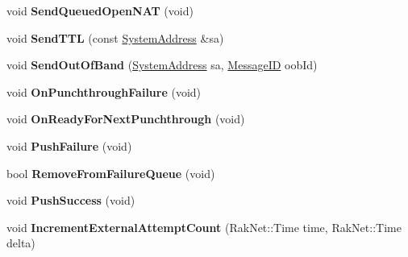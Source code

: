 \begin{DoxyCompactItemize}
\item 
\hypertarget{class_rak_net_1_1_nat_punchthrough_client_a8210cfd7a27ab5551362c7c826b4a342}{void {\bfseries Send\-Queued\-Open\-N\-A\-T} (void)}\label{class_rak_net_1_1_nat_punchthrough_client_a8210cfd7a27ab5551362c7c826b4a342}

\item 
\hypertarget{class_rak_net_1_1_nat_punchthrough_client_ad1348e04305a6d5cbbc39434c723815f}{void {\bfseries Send\-T\-T\-L} (const \hyperlink{struct_rak_net_1_1_system_address}{System\-Address} \&sa)}\label{class_rak_net_1_1_nat_punchthrough_client_ad1348e04305a6d5cbbc39434c723815f}

\item 
\hypertarget{class_rak_net_1_1_nat_punchthrough_client_a7e44f858286ee9057c19e596e1ebc6d7}{void {\bfseries Send\-Out\-Of\-Band} (\hyperlink{struct_rak_net_1_1_system_address}{System\-Address} sa, \hyperlink{namespace_rak_net_a1b2f3bf4bad2bb6a8360a12295fbed0c}{Message\-I\-D} oob\-Id)}\label{class_rak_net_1_1_nat_punchthrough_client_a7e44f858286ee9057c19e596e1ebc6d7}

\item 
\hypertarget{class_rak_net_1_1_nat_punchthrough_client_a64244c5c73a56c461dd35f65357660b4}{void {\bfseries On\-Punchthrough\-Failure} (void)}\label{class_rak_net_1_1_nat_punchthrough_client_a64244c5c73a56c461dd35f65357660b4}

\item 
\hypertarget{class_rak_net_1_1_nat_punchthrough_client_a0df37a851d63f4f0c2c0e1e02506a3d2}{void {\bfseries On\-Ready\-For\-Next\-Punchthrough} (void)}\label{class_rak_net_1_1_nat_punchthrough_client_a0df37a851d63f4f0c2c0e1e02506a3d2}

\item 
\hypertarget{class_rak_net_1_1_nat_punchthrough_client_af7caa65b7bfba1bd8782bb982f43b060}{void {\bfseries Push\-Failure} (void)}\label{class_rak_net_1_1_nat_punchthrough_client_af7caa65b7bfba1bd8782bb982f43b060}

\item 
\hypertarget{class_rak_net_1_1_nat_punchthrough_client_aa18e049e7bcb2fa66f385f648c591d3d}{bool {\bfseries Remove\-From\-Failure\-Queue} (void)}\label{class_rak_net_1_1_nat_punchthrough_client_aa18e049e7bcb2fa66f385f648c591d3d}

\item 
\hypertarget{class_rak_net_1_1_nat_punchthrough_client_abaab51c8d76f4c35f50bb62fa268a89e}{void {\bfseries Push\-Success} (void)}\label{class_rak_net_1_1_nat_punchthrough_client_abaab51c8d76f4c35f50bb62fa268a89e}

\item 
\hypertarget{class_rak_net_1_1_nat_punchthrough_client_a479a0e5d9b4cd46f8c74b15bb0ece7c0}{void {\bfseries Increment\-External\-Attempt\-Count} (Rak\-Net\-::\-Time time, Rak\-Net\-::\-Time delta)}\label{class_rak_net_1_1_nat_punchthrough_client_a479a0e5d9b4cd46f8c74b15bb0ece7c0}

\end{DoxyCompactItemize}
